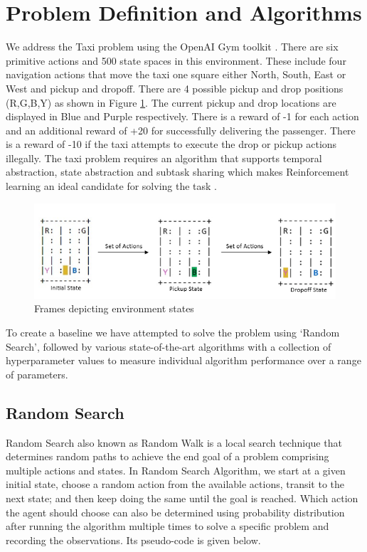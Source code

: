\documentclass{svproc}
\begin{document}
\section{Problem Definition and Algorithms}
\label{sec:3}
We address the Taxi problem using the OpenAI Gym toolkit \citep{knuthwebsite}. There are six primitive actions and 500 state spaces in this environment. These include four navigation actions that move the taxi one square either North, South, East or West and pickup and dropoff. There are 4 possible pickup and drop positions (R,G,B,Y) as shown in Figure \ref{fig:frames}. The current pickup and drop locations are displayed in Blue and Purple respectively. There is a reward of -1 for each action and an additional reward of +20 for successfully delivering the passenger. There is a reward of -10 if the taxi attempts to execute the drop or pickup actions illegally. The taxi problem requires an algorithm that supports temporal abstraction, state abstraction and subtask sharing which makes Reinforcement learning an ideal candidate for solving the task \citep{dietterich2000hierarchical}.
\begin{figure}[H]
\centering
\includegraphics{figures/frames.png}
\caption{Frames depicting environment states}
\label{fig:frames}
\end{figure}
To create a baseline we have attempted to solve the problem using ‘Random Search’, followed by various state-of-the-art algorithms with a collection of hyperparameter values to measure individual algorithm performance over a range of parameters.


\subsection{Random Search}
Random Search \citep{spitzer2013principles} also known as Random Walk is a local search technique that determines random paths to achieve the end goal of a problem comprising multiple actions and states. In Random Search Algorithm, we start at a given initial state, choose a random action from the available actions, transit to the next state; and then keep doing the same until the goal is reached. Which action the agent should choose can also be determined using probability distribution after running the algorithm multiple times to solve a specific problem and recording the observations. Its pseudo-code is given below.
\end{document}
